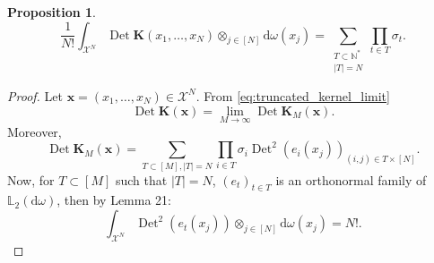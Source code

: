 \documentclass[twoside,11pt]{book}
\newtheorem{proposition}{Proposition}
\numberwithin{theorem}{chapter}
\numberwithin{definition}{chapter}
\numberwithin{proposition}{chapter}
\numberwithin{corollary}{chapter}
\numberwithin{example}{chapter}
\numberwithin{lemma}{chapter}
\numberwithin{assumption}{chapter}
\numberwithin{equation}{chapter}
\numberwithin{figure}{chapter}
\DeclareMathOperator{\Det}{Det}
\begin{document}
\begin{proposition}\label{lemma:truncated_Fredholm_formula}
\begin{equation}
  \frac{1}{N!} \int_{\mathcal{X}^{N}}\Det \bm{K}(x_{1}, \dots, x_{N}) \otimes_{j \in [N]} \mathrm{d}\omega(x_{j})  = \sum\limits_{\substack{T \subset \mathbb{N}^{*} \\ |T| = N}}  \prod\limits_{t \in T}\sigma_{t}.
\end{equation}
\end{proposition}
\begin{proof}
Let $\bm{x} = (x_{1}, \dots, x_{N}) \in \mathcal{X}^{N}$. From \eqref{eq:truncated_kernel_limit}
\begin{equation}
\Det \bm{K}(\bm{x}) = \lim\limits_{M \rightarrow \infty} \Det \bm{K}_{M}(\bm{x}).
\end{equation}
Moreover,
\begin{equation}
\Det \bm{K}_{M}(\bm{x})  = \sum\limits_{T \subset [M], |T| = N} \prod\limits_{i \in T} \sigma_{i} \Det^{2} (e_{i}(x_{j}))_{(i,j)\in T \times [N]}.
\end{equation}
Now, for $T \subset [M]$ such that $|T| = N$, $(e_{t})_{t \in T}$ is an orthonormal family of $\mathbb{L}_{2}(\mathrm{d}\omega)$, then by \cite{HoKrPeVi06} Lemma 21:
\begin{equation}
\int_{\mathcal{X}^{N}}\Det^{2} (e_{t}(x_{j})) \otimes_{j \in [N]} \mathrm{d}\omega(x_{j}) = N! .
\end{equation}


\end{proof}
\end{document}
